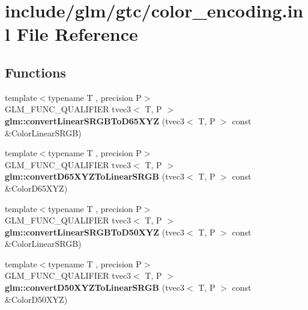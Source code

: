 \hypertarget{color__encoding_8inl}{}\section{include/glm/gtc/color\+\_\+encoding.inl File Reference}
\label{color__encoding_8inl}
\subsection*{Functions}
\begin{DoxyCompactItemize}
\item 
\mbox{\label{color__encoding_8inl_a8b469cdfa66e7369025674153e251f9c}} 
{\footnotesize template$<$typename T , precision P$>$ }\\G\+L\+M\+\_\+\+F\+U\+N\+C\+\_\+\+Q\+U\+A\+L\+I\+F\+I\+ER tvec3$<$ T, P $>$ {\bfseries glm\+::convert\+Linear\+S\+R\+G\+B\+To\+D65\+X\+YZ} (tvec3$<$ T, P $>$ const \&Color\+Linear\+S\+R\+GB)
\item 
\mbox{\label{color__encoding_8inl_ac74f1b15a48f761a75eef73b66f5e00b}} 
{\footnotesize template$<$typename T , precision P$>$ }\\G\+L\+M\+\_\+\+F\+U\+N\+C\+\_\+\+Q\+U\+A\+L\+I\+F\+I\+ER tvec3$<$ T, P $>$ {\bfseries glm\+::convert\+D65\+X\+Y\+Z\+To\+Linear\+S\+R\+GB} (tvec3$<$ T, P $>$ const \&Color\+D65\+X\+YZ)
\item 
\mbox{\label{color__encoding_8inl_acc3804c5ee87f8d40dc129daf339527a}} 
{\footnotesize template$<$typename T , precision P$>$ }\\G\+L\+M\+\_\+\+F\+U\+N\+C\+\_\+\+Q\+U\+A\+L\+I\+F\+I\+ER tvec3$<$ T, P $>$ {\bfseries glm\+::convert\+Linear\+S\+R\+G\+B\+To\+D50\+X\+YZ} (tvec3$<$ T, P $>$ const \&Color\+Linear\+S\+R\+GB)
\item 
\mbox{\label{color__encoding_8inl_ab8956f6e96828d61823eafe5e2828ae5}} 
{\footnotesize template$<$typename T , precision P$>$ }\\G\+L\+M\+\_\+\+F\+U\+N\+C\+\_\+\+Q\+U\+A\+L\+I\+F\+I\+ER tvec3$<$ T, P $>$ {\bfseries glm\+::convert\+D50\+X\+Y\+Z\+To\+Linear\+S\+R\+GB} (tvec3$<$ T, P $>$ const \&Color\+D50\+X\+YZ)
\item 
\mbox{\label{color__encoding_8inl_a58b0d0d80388abf226e864b15d1d49e9}} 

\end{DoxyCompactItemize}
